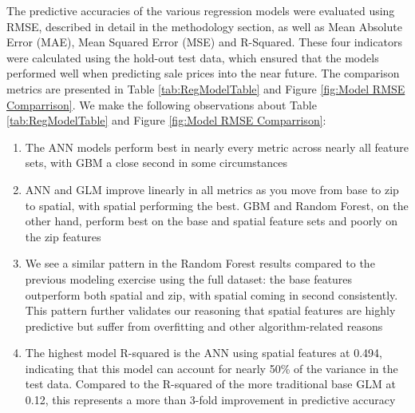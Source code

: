 \documentclass[12pt,]{article}
\providecommand{\tightlist}{%
  \setlength{\itemsep}{0pt}\setlength{\parskip}{0pt}}
\begin{document}
The predictive accuracies of the various regression models were
evaluated using RMSE, described in detail in the methodology section, as
well as Mean Absolute Error (MAE), Mean Squared Error (MSE) and
R-Squared. These four indicators were calculated using the hold-out test
data, which ensured that the models performed well when predicting sale
prices into the near future. The comparison metrics are presented in
Table \ref{tab:RegModelTable} and Figure
\ref{fig:Model RMSE Comparrison}. We make the following observations
about Table \ref{tab:RegModelTable} and Figure
\ref{fig:Model RMSE Comparrison}:

\begin{enumerate}
\def\labelenumi{\arabic{enumi})}
\tightlist
\item
  The ANN models perform best in nearly every metric across nearly all
  feature sets, with GBM a close second in some circumstances
\item
  ANN and GLM improve linearly in all metrics as you move from base to
  zip to spatial, with spatial performing the best. GBM and Random
  Forest, on the other hand, perform best on the base and spatial
  feature sets and poorly on the zip features
\item
  We see a similar pattern in the Random Forest results compared to the
  previous modeling exercise using the full dataset: the base features
  outperform both spatial and zip, with spatial coming in second
  consistently. This pattern further validates our reasoning that
  spatial features are highly predictive but suffer from overfitting and
  other algorithm-related reasons
\item
  The highest model R-squared is the ANN using spatial features at
  0.494, indicating that this model can account for nearly 50\% of the
  variance in the test data. Compared to the R-squared of the more
  traditional base GLM at 0.12, this represents a more than 3-fold
  improvement in predictive accuracy
\end{enumerate}
\end{document}

